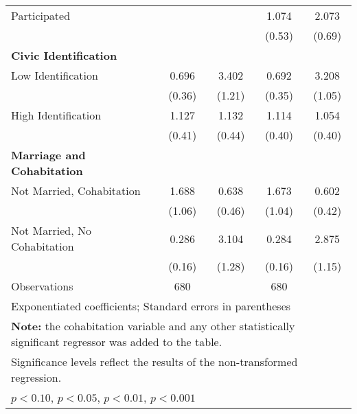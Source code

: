 \begin{table}[htbp]
\begin{tabular}{l*{4}{c}}
\hspace{0.25cm} Participated  &                   &                   &     1.074         &     2.073\sym{*}  \\
                              &                   &                   &    (0.53)         &    (0.69)         \\
\textbf{Civic Identification} &                   &                   &                   &                   \\
\hspace{0.25cm} Low Identification&     0.696         &     3.402\sym{**} &     0.692         &     3.208\sym{***}\\
                              &    (0.36)         &    (1.21)         &    (0.35)         &    (1.05)         \\
\hspace{0.25cm} High Identification&     1.127         &     1.132         &     1.114         &     1.054         \\
                              &    (0.41)         &    (0.44)         &    (0.40)         &    (0.40)         \\
\textbf{Marriage and Cohabitation}&                   &                   &                   &                   \\
\hspace{0.25cm} Not Married, Cohabitation&     1.688         &     0.638         &     1.673         &     0.602         \\
                              &    (1.06)         &    (0.46)         &    (1.04)         &    (0.42)         \\
\hspace{0.25cm} Not Married, No Cohabitation&     0.286\sym{*}  &     3.104\sym{**} &     0.284\sym{*}  &     2.875\sym{*}  \\
                              &    (0.16)         &    (1.28)         &    (0.16)         &    (1.15)         \\
\midrule
Observations                  &       680         &                   &       680         &                   \\
\bottomrule
\multicolumn{5}{l}{\footnotesize Exponentiated coefficients; Standard errors in parentheses}\\
\multicolumn{5}{l}{\footnotesize \textbf{Note:} the cohabitation variable and any other statistically significant regressor was added to the table.}\\
\multicolumn{5}{l}{\footnotesize Significance levels reflect the results of the non-transformed regression.}\\
\multicolumn{5}{l}{\footnotesize \sym{^+} \(p<0.10\), \sym{*} \(p<0.05\), \sym{**} \(p<0.01\), \sym{***} \(p<0.001\)}\\
\end{tabular}
\end{table}

